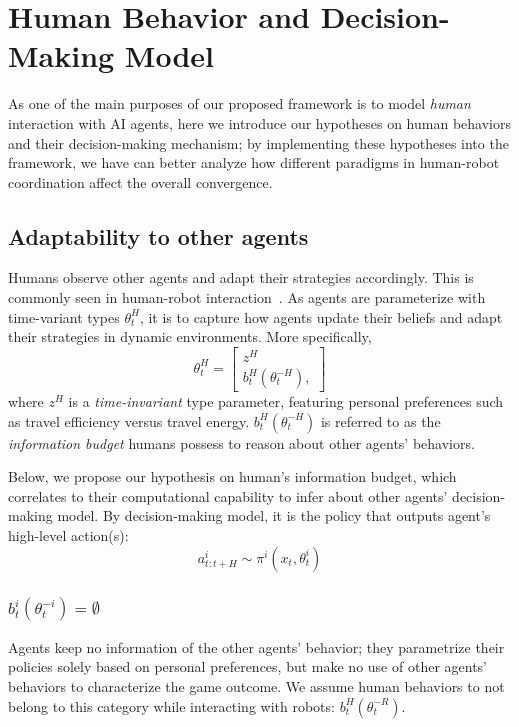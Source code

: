 \documentclass[letterpaper, 10 pt, conference]{ieeeconf}  %
\begin{document}
\section{Human Behavior and Decision-Making Model}\label{sec:human_behavior}
As one of the main purposes of our proposed framework is to model \textit{human} 
interaction with AI agents, here we introduce our hypotheses on human 
behaviors and their decision-making mechanism; by implementing these hypotheses 
into the framework, we have can better analyze how different paradigms in 
human-robot coordination affect the overall convergence.

\subsection{Adaptability to other agents}\label{sec:adaptability}
Humans observe other agents and adapt their strategies accordingly. This is 
commonly seen in human-robot interaction~\cite{nikolaidis2016formalizing,yang2017evaluating}. As agents are parameterize with time-variant types 
$\theta^H_t$, it is to capture how agents update their beliefs and adapt their 
strategies in dynamic environments. More specifically,
\begin{equation}
  \theta^H_t = \begin{bmatrix}
    z^H \\
    b^H_t(\theta^{-H}_t),
  \end{bmatrix}
\end{equation}
  where $z^H$ is a \textit{time-invariant} type parameter, featuring personal 
  preferences such as travel efficiency versus travel energy. 
  $b^H_t(\theta^{-H}_t)$ is referred to as the \textit{information budget} humans 
  possess to reason about other agents' behaviors.

 Below, we propose our hypothesis on human's information budget, which 
 correlates to their computational capability to infer about other agents' 
 decision-making model. By decision-making model, it is the policy that outputs agent's high-level action(s):
 \begin{equation}
   a^i_{t:t+H} \sim \pi^i(x_t,\theta^i_t)
 \end{equation}
\subsubsection{$b^i_t(\theta^{-i}_t) = \emptyset$} 
Agents keep no information of the 
other agents' behavior; they parametrize their policies solely based on personal 
preferences, but make no use of other agents' behaviors to characterize the 
game outcome. We assume human behaviors to not belong to this 
category while interacting with robots: $b^H_t(\theta^{-R}_t)$.
\end{document}
